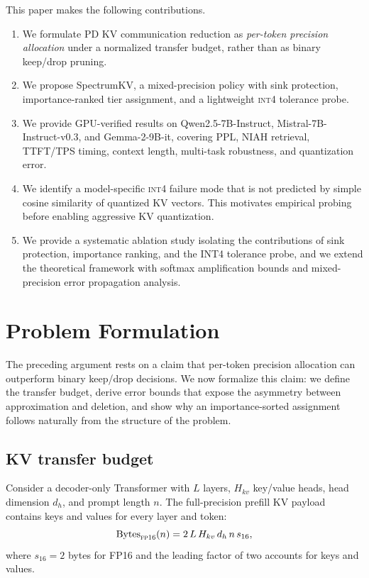 \documentclass[11pt]{article}
\newcommand{\method}{SpectrumKV}
\newcommand{\niah}{NIAH}
\newcommand{\fp}{\textsc{fp16}}
\newcommand{\intiv}{\textsc{int4}}
\theoremstyle{plain}
\theoremstyle{definition}
\begin{document}
This paper makes the following contributions.
\begin{enumerate}[leftmargin=1.6em,itemsep=2pt]
    \item We formulate PD KV communication reduction as \emph{per-token precision allocation} under a normalized transfer budget, rather than as binary keep/drop pruning.
    \item We propose \method{}, a mixed-precision policy with sink protection, importance-ranked tier assignment, and a lightweight \intiv{} tolerance probe.
    \item We provide GPU-verified results on Qwen2.5-7B-Instruct, Mistral-7B-Instruct-v0.3, and Gemma-2-9B-it, covering PPL, \niah{} retrieval, TTFT/TPS timing, context length, multi-task robustness, and quantization error.
    \item We identify a model-specific \intiv{} failure mode that is not predicted by simple cosine similarity of quantized KV vectors.  This motivates empirical probing before enabling aggressive KV quantization.
    \item We provide a systematic ablation study isolating the contributions of sink protection, importance ranking, and the INT4 tolerance probe, and we extend the theoretical framework with softmax amplification bounds and mixed-precision error propagation analysis.
\end{enumerate}

\section{Problem Formulation}
\label{sec:formulation}

The preceding argument rests on a claim that per-token precision allocation can outperform binary keep/drop decisions.  We now formalize this claim: we define the transfer budget, derive error bounds that expose the asymmetry between approximation and deletion, and show why an importance-sorted assignment follows naturally from the structure of the problem.

\subsection{KV transfer budget}
Consider a decoder-only Transformer with $L$ layers, $H_{kv}$ key/value heads, head dimension $d_h$, and prompt length $n$.  The full-precision prefill KV payload contains keys and values for every layer and token:
\begin{equation}
  \mathrm{Bytes}_{\fp{}}(n)= 2\,L\,H_{kv}\,d_h\,n\,s_{16},
  \label{eq:fullbytes}
\end{equation}
where $s_{16}=2$ bytes for FP16 and the leading factor of two accounts for keys and values.
\end{document}
